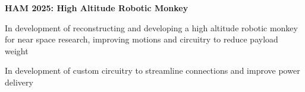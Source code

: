     \vspace{0.2 cm}

    \begin{twocolentry}{
        
    }
        \textbf{HAM 2025: High Altitude Robotic Monkey}\end{twocolentry}

    \vspace{0.10 cm}
    \begin{onecolentry}
        \begin{highlights}
            \item In development of reconstructing and developing a high altitude robotic monkey for near space research, improving motions and circuitry to reduce payload weight
            \item In development of custom circuitry to streamline connections and improve power delivery
        \end{highlights}
    \end{onecolentry}